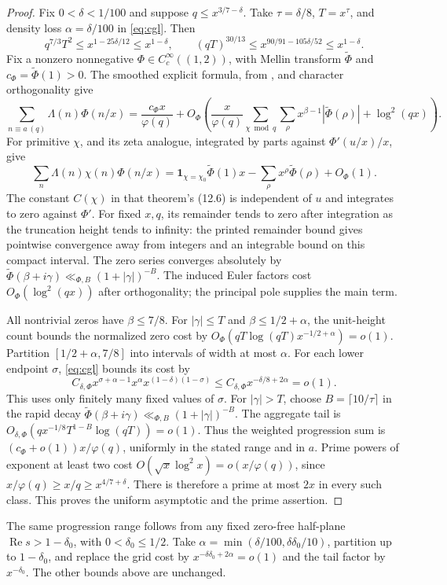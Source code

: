 \documentclass[11pt]{article}
\theoremstyle{definition}
\newcommand{\ind}{\mathbf 1}
\newcommand{\ph}{\varphi}
\DeclareMathOperator{\Rea}{Re}
\begin{document}
\begin{proof}
Fix $0<\delta<1/100$ and suppose $q\le x^{3/7-\delta}$.
Take $\tau=\delta/8$, $T=x^\tau$, and density loss
$\alpha=\delta/100$ in \eqref{eq:cgl}.
Then
\[
 q^{7/3}T^2\le x^{1-25\delta/12}\le x^{1-\delta},\qquad
 (qT)^{30/13}\le
 x^{90/91-105\delta/52}\le x^{1-\delta}.
\]
Fix a nonzero nonnegative $\Phi\in C_c^\infty((1,2))$, with Mellin
transform $\widetilde\Phi$ and $c_\Phi=\widetilde\Phi(1)>0$.
The smoothed explicit formula, from
\cite[Theorem 12.10 and the zeta formula in Chapter 12]{MV}, and
character orthogonality give
\[
 \sum_{n\equiv a\ (q)}\Lambda(n)\Phi(n/x)
 =\frac{c_\Phi x}{\ph(q)}
 +O_\Phi\left(\frac{x}{\ph(q)}
     \sum_{\chi\bmod q}\sum_\rho x^{\beta-1}
                   |\widetilde\Phi(\rho)|+\log^2(qx)\right).
\]
For primitive $\chi$, \cite[Theorem~12.10]{MV} and its zeta analogue,
integrated by parts against $\Phi'(u/x)/x$, give
\[
 \sum_n\Lambda(n)\chi(n)\Phi(n/x)
 =\ind_{\chi=\chi_0}\widetilde\Phi(1)x
   -\sum_\rho x^\rho\widetilde\Phi(\rho)+O_\Phi(1).
\]
The constant $C(\chi)$ in that theorem's (12.6) is independent of
$u$ and integrates to zero against $\Phi'$.
For fixed $x,q$, its remainder tends to zero after integration as the
truncation height tends to infinity: the printed remainder bound
gives pointwise convergence away from integers and an integrable
bound on this compact interval. The zero series converges absolutely
by $\widetilde\Phi(\beta+i\gamma)\ll_{\Phi,B}(1+|\gamma|)^{-B}$.
The induced Euler factors cost $O_\Phi(\log^2(qx))$ after orthogonality;
the principal pole supplies the main term.

All nontrivial zeros have $\beta\le7/8$.
For $|\gamma|\le T$ and $\beta\le1/2+\alpha$, the unit-height count
\cite[Theorem 10.17]{MV} bounds the normalized zero cost by
$O_\Phi(qT\log(qT)x^{-1/2+\alpha})=o(1)$.
Partition $[1/2+\alpha,7/8]$ into intervals of width at most $\alpha$.
For each lower endpoint $\sigma$, \eqref{eq:cgl} bounds its cost by
\[
 C_{\delta,\Phi}x^{\sigma+\alpha-1}
       x^\alpha x^{(1-\delta)(1-\sigma)}
 \le C_{\delta,\Phi}x^{-\delta/8+2\alpha}=o(1).
\]
This uses only finitely many fixed values of $\sigma$.
For $|\gamma|>T$, choose $B=\lceil10/\tau\rceil$ in the rapid decay
$\widetilde\Phi(\beta+i\gamma)\ll_{\Phi,B}(1+|\gamma|)^{-B}$.
The aggregate tail is
$O_{\delta,\Phi}(q x^{-1/8}T^{1-B}\log(qT))=o(1)$.
Thus the weighted progression sum is
$(c_\Phi+o(1))x/\ph(q)$, uniformly in the stated range and in $a$.
Prime powers of exponent at least two cost
$O(\sqrt x\log^2x)=o(x/\ph(q))$, since
$x/\ph(q)\ge x/q\ge x^{4/7+\delta}$.
There is therefore a prime at most $2x$ in every such class.
This proves the uniform asymptotic and the prime assertion.
\end{proof}
The same progression range follows from any fixed zero-free half-plane
$\Rea s>1-\delta_0$, with $0<\delta_0\le1/2$.
Take $\alpha=\min(\delta/100,\delta\delta_0/10)$, partition up to
$1-\delta_0$, and replace the grid cost by
$x^{-\delta\delta_0+2\alpha}=o(1)$ and the tail factor by
$x^{-\delta_0}$. The other bounds above are unchanged.
\end{document}
